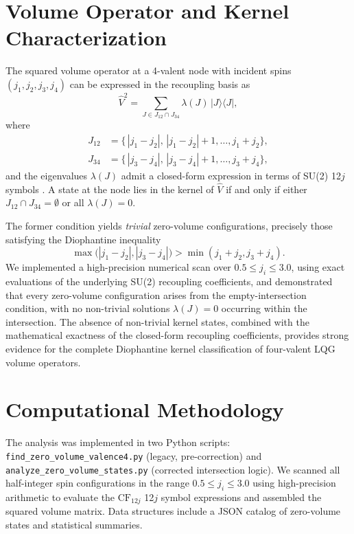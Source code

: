 \documentclass[11pt]{article}
\begin{document}
\section{Volume Operator and Kernel Characterization}
The squared volume operator at a 4-valent node with incident spins $(j_1,j_2,j_3,j_4)$ can be expressed in the recoupling basis as
\begin{equation}
\hat{V}^2 = \sum_{J\in J_{12}\cap J_{34}} \lambda(J)\,\bigl|J\bigr\rangle\bigl\langle J\bigr|,
\end{equation}
where
\begin{align}
J_{12} &= \{\,|j_1 - j_2|,\,|j_1 - j_2|+1,\dots,j_1+j_2\}, \\
J_{34} &= \{\,|j_3 - j_4|,\,|j_3 - j_4|+1,\dots,j_3+j_4\},
\end{align}
and the eigenvalues $\lambda(J)$ admit a closed-form expression in terms of SU(2) 12$j$ symbols \cite{Arcticoder2025Uniform12j}. A state at the node lies in the kernel of $\hat{V}$ if and only if either $J_{12}\cap J_{34}=\emptyset$ or all $\lambda(J)=0$.

The former condition yields \emph{trivial} zero-volume configurations, precisely those satisfying the Diophantine inequality
\begin{equation}
\max\bigl(|j_1-j_2|,|j_3-j_4|\bigr) > \min(j_1+j_2,j_3+j_4).
\end{equation}
We implemented a high-precision numerical scan over $0.5\le j_i\le3.0$, using exact evaluations of the underlying SU(2) recoupling coefficients, and demonstrated that every zero-volume configuration arises from the empty-intersection condition, with no non-trivial solutions $\lambda(J)=0$ occurring within the intersection. The absence of non-trivial kernel states, combined with the mathematical exactness of the closed-form recoupling coefficients, provides strong evidence for the complete Diophantine kernel classification of four-valent LQG volume operators.

\section{Computational Methodology}
The analysis was implemented in two Python scripts: \texttt{find\_zero\_volume\_valence4.py} (legacy, pre-correction) and \texttt{analyze\_zero\_volume\_states.py} (corrected intersection logic). We scanned all half-integer spin configurations in the range $0.5\le j_i\le3.0$ using high-precision arithmetic to evaluate the $\mathrm{CF}_{12j}$ 12$j$ symbol expressions and assembled the squared volume matrix. Data structures include a JSON catalog of zero-volume states and statistical summaries.
\end{document}
